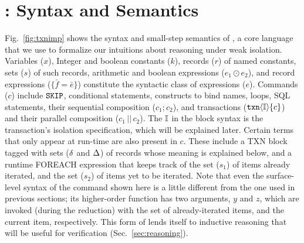 \section{\txnimp: Syntax and Semantics}
\label{sec:opsem}

\label{sec:syntax}



Fig.~\ref{fig:txnimp} shows the syntax and small-step semantics of
\txnimp, a core language that we use to formalize our intuitions about
reasoning under weak isolation. Variables ($x$), Integer and boolean
constants ($k$), records ($r$) of named constants, sets ($s$) of such
records, arithmetic and boolean expressions ($e_1 \odot e_2$), and
record expressions ($\{\bar{f}=\bar{e}\}$) constitute the syntactic
class of expressions ($e$). Commands ($c$) include $\cskip$,
conditional statements,  constructs to bind names, 
loops, SQL statements, their sequential composition ($c_1;c_2$), and
transactions ($\ctxn{i}{\I}{c}$) and their parallel composition
($c_1\,||\,c_2$). The $\I$ in the  block syntax is the
transaction's isolation specification, which will be explained later.
Certain terms that only appear at run-time are also present in $c$.
These include a \textsc{TXN} block tagged with sets ($\stl$ and $\stg$) of
records whose meaning is explained below, and a runtime \textsc{FOREACH}
expression that keeps track of the set ($s_1$) of items already
iterated, and the set ($s_2$) of items yet to be iterated. Note that
even the surface-level syntax of the  command shown here is
a little different from the one used in previous sections; its
higher-order function has two arguments, $y$ and $z$, which are
invoked (during the reduction) with the set of already-iterated items,
and the current item, respectively. This form of  lends
itself to inductive reasoning that will be useful for verification
(Sec.~\ref{sec:reasoning}).


